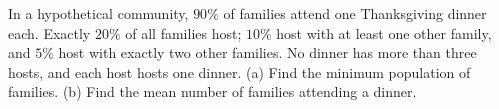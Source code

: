In a hypothetical community, $90\%$ of families attend one Thanksgiving dinner each. Exactly $20\%$ of all families host; $10\%$ host with at least one other family, and $5\%$ host with exactly two other families. No dinner has more than three hosts, and each host hosts one dinner. (a) Find the minimum population of families. (b) Find the mean number of families attending a dinner.
